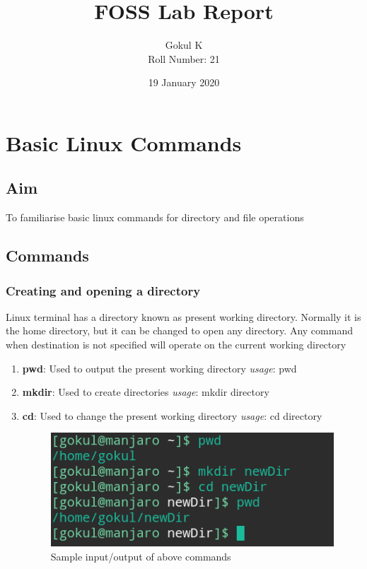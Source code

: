 \documentclass{article}
\begin{document}
\title{FOSS Lab Report}
\author{Gokul K\\[2\baselineskip]
Roll Number: 21\\[2\baselineskip]}
\date{19 January 2020}

\maketitle

\section{Basic Linux Commands}
\subsection{Aim}
To familiarise basic linux commands for directory and file operations
\subsection{Commands}
\subsubsection{Creating and opening a directory}
Linux terminal has a directory known as present working directory. Normally it is the home directory, but it can be changed to open any directory. Any command when destination is not specified will operate on the current working directory

\begin{enumerate}
    \item {\bf pwd}: Used to output the present working directory\newline
    \hspace{\parindent} {\em usage}: pwd
    \item {\bf mkdir}: Used to create directories\newline
    \hspace{\parindent} {\em usage}: mkdir directory
    
    \item {\bf cd}: Used to change the present working directory\newline
    \hspace{\parindent} {\em usage}: cd directory
    
    \begin{figure}
        \centering
        \includegraphics[width=.80\textwidth]{img/p1/ss1.png}
        \caption{Sample input/output of above commands}
    \end{figure}
\end{enumerate}
\end{document}
